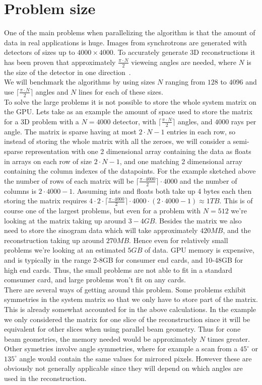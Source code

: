 \section{Problem size}
One of the main problems when parallelizing the algorithm is that the amount of data in real applications is huge. Images from synchrotrons are generated with detectors of sizes up to $4000\times4000$. To accurately generate 3D reconstructions it has been proven that approximately $\frac{\pi\cdot N}{2}$ vieweing angles are needed, where $N$ is the size of the detector in one direction~\cite{natterer2001}.\\
We will benchmark the algorithms by using sizes $N$ ranging from $128$ to $4096$ and use $\lceil\frac{\pi\cdot N}{2}\rceil$ angles and $N$ lines for each of these sizes.\\
To solve the large problems it is not possible to store the whole system matrix on the GPU. Lets take as an example the amount of space used to store the matrix for a 3D problem with a $N=4000$ detector, with $\lceil\frac{\pi\cdot N}{2}\rceil$ angles, and $4000$ rays per angle. The matrix is sparse having at most $2\cdot N-1$ entries in each row, so instead of storing the whole matrix with all the zeroes, we will consider a semi-sparse representation with one 2 dimensional array containing the data as floats in arrays on each row of size  $2\cdot N-1$, and one matching 2 dimensional array containing the column indexes of the datapoints. For the example sketched above the number of rows of each matrix will be $\lceil\frac{\pi\cdot4000}{2}\rceil\cdot4000$ and the number of columns is $2\cdot 4000-1$. Assuming ints and floats both take up 4 bytes each then storing the matrix requires $4\cdot 2\cdot\lceil\frac{\pi\cdot 4000}{2}\rceil\cdot4000\cdot(2\cdot 4000-1)\approx1TB$. This is of course one of the largest problems, but even for a problem with $N=512$ we're looking at the matrix taking up around $3-4GB$. Besides the matrix we also need to store the sinogram data which will take approximately $420MB$, and the reconstruction taking up around $270MB$. Hence even for relatively small problems we're looking at an estimated $5GB$ of data. GPU memory is expensive, and is typically in the range 2-8GB for consumer end cards, and 10-48GB for high end cards. Thus, the small problems are not able to fit in a standard comsumer card, and large problems won't fit on any cards.\\
There are several ways of getting around this problem. Some problems exhibit symmetries in the system matrix so that we only have to store part of the matrix. This is already somewhat accounted for in the above calculations. In the example we only considered the matrix for one slice of the reconstruction since it will be equivalent for other slices when using parallel beam geometry. Thus for cone beam geometries, the memory needed would be approximately $N$ times greater. Other symetries involve angle symmetries, where for example a scan from a $45^{\circ}$ or $135^{\circ}$ angle would contain the same values for mirrored pixels. However these are obviously not generally applicable since they will depend on which angles are used in the reconstruction.\\
